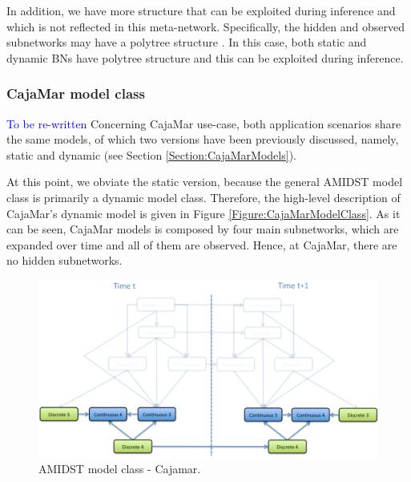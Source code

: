 In addition, we have more structure that can be exploited during inference and which is not reflected in this meta-network. Specifically, the hidden and observed subnetworks may have a polytree structure \cite{JensenNielsen2007}. In this case, both static and dynamic BNs have polytree structure and this can be exploited during inference. 

\subsubsection{CajaMar model class}
\textcolor{blue}{To be re-written}
Concerning CajaMar use-case, both application scenarios share the same models, of which two versions have been previously discussed, namely, static and dynamic (see Section \ref{Section:CajaMarModels}). 

At this point, we obviate the static version, because the general AMIDST model class is primarily a dynamic model class. Therefore, the high-level description of CajaMar's dynamic model is given in Figure \ref{Figure:CajaMarModelClass}. As it can be seen, CajaMar models is composed by four main subnetworks, which are expanded over time and all of them are observed. Hence, at CajaMar, there are no hidden subnetworks. 


\begin{figure}[ht!]
\begin{center}
\includegraphics[scale=0.39]{./figures/AMIDSTModelClassCajamar.png}
\caption{\label{Figure:AMIDSTModelClassCajamar} AMIDST model class - Cajamar.}
\end{center}
\end{figure}


